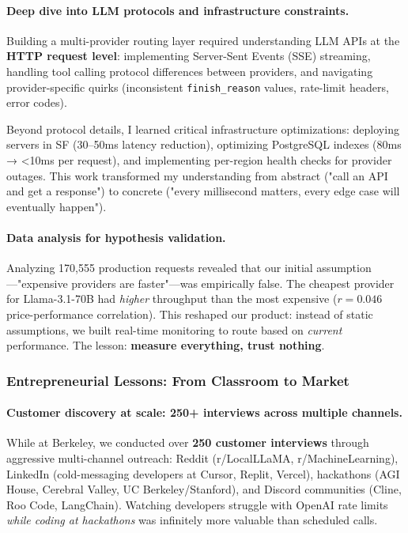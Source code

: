 \documentclass[english]{article}
\begin{document}
\paragraph{Deep dive into LLM protocols and infrastructure constraints.}

Building a multi-provider routing layer required understanding LLM APIs at the \textbf{HTTP request level}: implementing Server-Sent Events (SSE) streaming, handling tool calling protocol differences between providers, and navigating provider-specific quirks (inconsistent \texttt{finish\_reason} values, rate-limit headers, error codes).

Beyond protocol details, I learned critical infrastructure optimizations: deploying servers in SF (30--50ms latency reduction), optimizing PostgreSQL indexes (80ms → <10ms per request), and implementing per-region health checks for provider outages. This work transformed my understanding from abstract ("call an API and get a response") to concrete ("every millisecond matters, every edge case will eventually happen").

\paragraph{Data analysis for hypothesis validation.}

Analyzing 170,555 production requests revealed that our initial assumption—"expensive providers are faster"—was empirically false. The cheapest provider for Llama-3.1-70B had \emph{higher} throughput than the most expensive ($r = 0.046$ price-performance correlation). This reshaped our product: instead of static assumptions, we built real-time monitoring to route based on \emph{current} performance. The lesson: \textbf{measure everything, trust nothing}.

\subsubsection{Entrepreneurial Lessons: From Classroom to Market}

\paragraph{Customer discovery at scale: 250+ interviews across multiple channels.}

While at Berkeley, we conducted over \textbf{250 customer interviews} through aggressive multi-channel outreach: Reddit (r/LocalLLaMA, r/MachineLearning), LinkedIn (cold-messaging developers at Cursor, Replit, Vercel), hackathons (AGI House, Cerebral Valley, UC Berkeley/Stanford), and Discord communities (Cline, Roo Code, LangChain). Watching developers struggle with OpenAI rate limits \emph{while coding at hackathons} was infinitely more valuable than scheduled calls.
\end{document}
